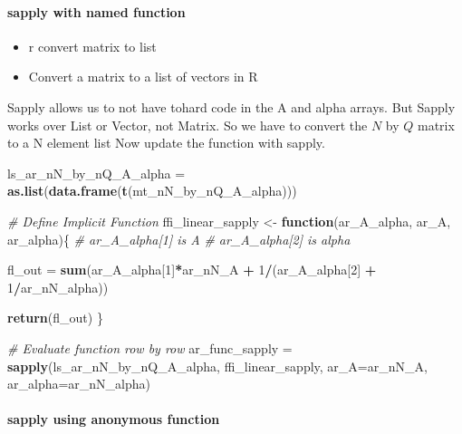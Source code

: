 \documentclass[
]{book}
\newenvironment{Shaded}{\begin{snugshade}}{\end{snugshade}}
\newcommand{\CommentTok}[1]{\textcolor[rgb]{0.56,0.35,0.01}{\textit{#1}}}
\newcommand{\ControlFlowTok}[1]{\textcolor[rgb]{0.13,0.29,0.53}{\textbf{#1}}}
\newcommand{\DataTypeTok}[1]{\textcolor[rgb]{0.13,0.29,0.53}{#1}}
\newcommand{\DecValTok}[1]{\textcolor[rgb]{0.00,0.00,0.81}{#1}}
\newcommand{\KeywordTok}[1]{\textcolor[rgb]{0.13,0.29,0.53}{\textbf{#1}}}
\newcommand{\NormalTok}[1]{#1}
\newcommand{\OperatorTok}[1]{\textcolor[rgb]{0.81,0.36,0.00}{\textbf{#1}}}
\newcommand{\StringTok}[1]{\textcolor[rgb]{0.31,0.60,0.02}{#1}}
\providecommand{\tightlist}{%
  \setlength{\itemsep}{0pt}\setlength{\parskip}{0pt}}
\begin{document}
\hypertarget{sapply-with-named-function}{%
\paragraph{sapply with named function}\label{sapply-with-named-function}}

\begin{itemize}
\tightlist
\item
  r convert matrix to list
\item
  Convert a matrix to a list of vectors in R
\end{itemize}

Sapply allows us to not have tohard code in the A and alpha arrays. But Sapply works over List or Vector, not Matrix. So we have to convert the \(N\) by \(Q\) matrix to a N element list
Now update the function with sapply.

\begin{Shaded}
\begin{Highlighting}[]
\NormalTok{ls_ar_nN_by_nQ_A_alpha =}\StringTok{ }\KeywordTok{as.list}\NormalTok{(}\KeywordTok{data.frame}\NormalTok{(}\KeywordTok{t}\NormalTok{(mt_nN_by_nQ_A_alpha)))}

\CommentTok{# Define Implicit Function}
\NormalTok{ffi_linear_sapply <-}\StringTok{ }\ControlFlowTok{function}\NormalTok{(ar_A_alpha, ar_A, ar_alpha)\{}
  \CommentTok{# ar_A_alpha[1] is A}
  \CommentTok{# ar_A_alpha[2] is alpha}

\NormalTok{  fl_out =}\StringTok{ }\KeywordTok{sum}\NormalTok{(ar_A_alpha[}\DecValTok{1}\NormalTok{]}\OperatorTok{*}\NormalTok{ar_nN_A }\OperatorTok{+}\StringTok{ }\DecValTok{1}\OperatorTok{/}\NormalTok{(ar_A_alpha[}\DecValTok{2}\NormalTok{] }\OperatorTok{+}\StringTok{ }\DecValTok{1}\OperatorTok{/}\NormalTok{ar_nN_alpha))}

  \KeywordTok{return}\NormalTok{(fl_out)}
\NormalTok{\}}

\CommentTok{# Evaluate function row by row}
\NormalTok{ar_func_sapply =}\StringTok{ }\KeywordTok{sapply}\NormalTok{(ls_ar_nN_by_nQ_A_alpha, ffi_linear_sapply,}
                        \DataTypeTok{ar_A=}\NormalTok{ar_nN_A, }\DataTypeTok{ar_alpha=}\NormalTok{ar_nN_alpha)}
\end{Highlighting}
\end{Shaded}

\hypertarget{sapply-using-anonymous-function}{%
\paragraph{sapply using anonymous function}\label{sapply-using-anonymous-function}}
\end{document}
